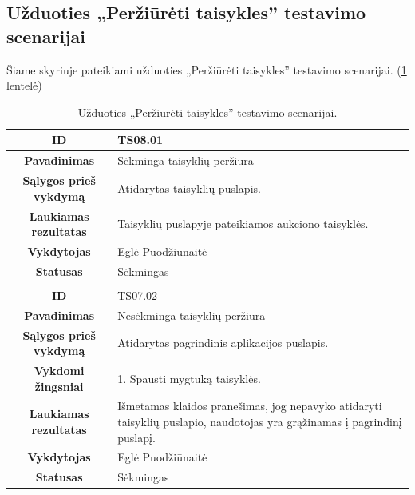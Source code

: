 \documentclass{VUMIFPSkursinis}
\begin{document}
		\subsection{Užduoties „Peržiūrėti taisykles” testavimo scenarijai}
	Šiame skyriuje pateikiami užduoties „Peržiūrėti taisykles” testavimo scenarijai. (\ref{taisykles} lentelė)
	\begin{table}[H]
		\caption{Užduoties „Peržiūrėti taisykles” testavimo scenarijai.}
		\begin{tabular}{|p{6cm}|p{11cm}|}
			\hline
			\multicolumn{1}{|c|}{{\bfseries ID}}&
			{TS08.01}\\
			\hline
			\multicolumn{1}{|c|}{{\bfseries Pavadinimas}}&
			{Sėkminga taisyklių peržiūra}\\
			\hline
			\multicolumn{1}{|c|}{{\bfseries Sąlygos prieš vykdymą}}&
			{Atidarytas taisyklių puslapis.}\\
			\hline
			\multicolumn{1}{|c|}{{\bfseries Laukiamas rezultatas}}&
			{Taisyklių puslapyje pateikiamos aukciono taisyklės.}\\
			\hline
			\multicolumn{1}{|c|}{{\bfseries Vykdytojas}}&
			{Eglė Puodžiūnaitė}\\
			\hline
			\multicolumn{1}{|c|}{{\bfseries Statusas}}&
			{Sėkmingas}\\
			\hline
			\rowcolor{lightgray}
			\multicolumn{2}{|c|}{}\\
			\hline				
			\multicolumn{1}{|c|}{{\bfseries ID}}&
			{TS07.02}\\
			\hline
			\multicolumn{1}{|c|}{{\bfseries Pavadinimas}}&
			{Nesėkminga taisyklių peržiūra}\\
			\hline
			\multicolumn{1}{|c|}{{\bfseries Sąlygos prieš vykdymą}}&
			{Atidarytas pagrindinis aplikacijos puslapis.}\\
			\hline
			\multicolumn{1}{|c|}{{\bfseries Vykdomi žingsniai}}&
			{1. Spausti mygtuką taisyklės.}\\
			\hline
			\multicolumn{1}{|c|}{{\bfseries Laukiamas rezultatas}}&
			{Išmetamas klaidos pranešimas, jog nepavyko atidaryti taisyklių puslapio, naudotojas yra grąžinamas į pagrindinį puslapį.}\\
			\hline
			\multicolumn{1}{|c|}{{\bfseries Vykdytojas}}&
			{Eglė Puodžiūnaitė}\\
			\hline
			\multicolumn{1}{|c|}{{\bfseries Statusas}}&
			{Sėkmingas}\\
			\hline		
		\end{tabular}
		\label{taisykles}
	\end{table}	
\end{document}
